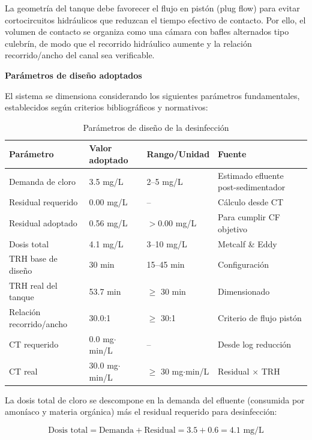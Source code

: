 \documentclass[12pt,a4paper]{article}
\begin{document}
La geometría del tanque debe favorecer el flujo en pistón (plug flow) para evitar cortocircuitos hidráulicos que reduzcan el tiempo efectivo de contacto. Por ello, el volumen de contacto se organiza como una cámara con bafles alternados tipo culebrín, de modo que el recorrido hidráulico aumente y la relación recorrido/ancho del canal sea verificable.

\textbf{Parámetros de diseño adoptados}

El sistema se dimensiona considerando los siguientes parámetros fundamentales, establecidos según criterios bibliográficos y normativos:

\begin{table}[H]
\centering
\caption{Parámetros de diseño de la desinfección}
\small
\begin{tabular}{@{}p{}p{}p{}p{}@{}}
\toprule
\textbf{Parámetro} & \textbf{Valor adoptado} & \textbf{Rango/Unidad} & \textbf{Fuente} \\
\midrule
Demanda de cloro & 3.5 mg/L & 2--5 mg/L & Estimado efluente post-sedimentador \\
Residual requerido & 0.00 mg/L & -- & Cálculo desde CT \\
Residual adoptado & 0.56 mg/L & $>$0.00 mg/L & Para cumplir CF objetivo \\
Dosis total & 4.1 mg/L & 3--10 mg/L & Metcalf \& Eddy \cite{metcalf2014} \\
TRH base de diseño & 30 min & 15--45 min & Configuración \\
TRH real del tanque & 53.7 min & $\geq$ 30 min & Dimensionado \\
Relación recorrido/ancho & 30.0:1 & $\geq$ 30:1 & Criterio de flujo pistón \\
CT requerido & 0.0 mg$\cdot$min/L & -- & Desde log reducción \\
CT real & 30.0 mg$\cdot$min/L & $\geq$ 30 mg$\cdot$min/L & Residual $\times$ TRH \\
\bottomrule
\end{tabular}
\end{table}

La dosis total de cloro se descompone en la demanda del efluente (consumida por amoníaco y materia orgánica) más el residual requerido para desinfección:

\begin{equation}
\text{Dosis total} = \text{Demanda} + \text{Residual} = 3.5 + 0.6 = 4.1 \text{ mg/L}
\end{equation}
\end{document}
